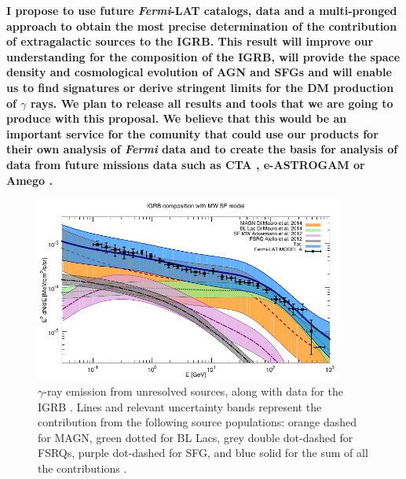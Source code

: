 \documentclass[12 pt]{article}
\newcommand{\FIXME}[1]{{\color{red}{\em Comment: }{#1}}}
\begin{document}


{\bf I propose to use future {\it Fermi}-LAT catalogs, data and a multi-pronged approach to obtain the most precise determination of the contribution of extragalactic sources to the IGRB.  This result will improve our understanding for the composition of the IGRB, will provide the space density and cosmological evolution of AGN and SFGs and will enable us to find signatures or derive stringent limits for the DM production of $\gamma$ rays.
We plan to release all results and tools that we are going to produce with this proposal. 
We believe that this would be an important service for the comunity that could use our products for their own analysis of {\it Fermi} data and to create the basis for analysis of data from future missions data such as CTA \cite{Ong:2017ihp}, e-ASTROGAM \cite{Tatischeff:2016ykb} or Amego \cite{Moiseev:2015lva}.}


\begin{figure} %
   \centering
  \includegraphics[width=4.0in]{fluxcompart_2014_unr.pdf} 
   \caption{$\gamma$-ray emission from unresolved sources, along with 
data for the IGRB \cite{Ackermann:2014usa}. Lines and relevant uncertainty bands represent the contribution from the following source populations: orange dashed for MAGN,  green dotted for BL Lacs, grey double dot-dashed for FSRQs, purple dot-dashed for SFG, and blue solid for the sum of all the contributions \cite{DiMauro:2015tfa}.}
   \label{fig:igrbcomp}
\end{figure}
\end{document}
